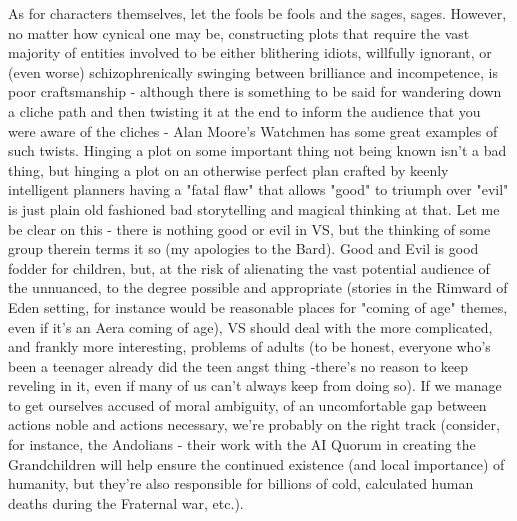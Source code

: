 As for characters themselves, let the fools be fools and the sages,
sages. However, no matter how cynical one may be, constructing plots
that require the vast majority of entities involved to be either
blithering idiots, willfully ignorant, or (even worse)
schizophrenically swinging between brilliance and incompetence, is
poor craftsmanship - although there is something to be said for
wandering down a cliche path and then twisting it at the end to inform
the audience that you were aware of the cliches - Alan Moore's Watchmen
has some great examples of such twists. Hinging a plot on some
important thing not being known isn't a bad thing, but hinging a plot
on an otherwise perfect plan crafted by keenly intelligent planners
having a "fatal flaw" that allows "good" to triumph over "evil" is
just plain old fashioned bad storytelling and magical thinking at
that. Let me be clear on this - there is nothing good or evil in VS,
but the thinking of some group therein terms it so (my apologies to
the Bard).  Good and Evil is good fodder for children, but, at the
risk of alienating the vast potential audience of the unnuanced, to
the degree possible and appropriate (stories in the Rimward of Eden
setting, for instance would be reasonable places for "coming of age"
themes, even if it's an Aera coming of age), VS should deal with the
more complicated, and frankly more interesting, problems of adults (to
be honest, everyone who's been a teenager already did the teen angst
thing -there's no reason to keep reveling in it, even if many of us
can't always keep from doing so). If we manage to get ourselves
accused of moral ambiguity, of an uncomfortable gap between actions
noble and actions necessary, we're probably on the right track
(consider, for instance, the Andolians - their work with the AI Quorum
in creating the Grandchildren will help ensure the continued existence
(and local importance) of humanity, but they're also responsible for
billions of cold, calculated human deaths during the Fraternal war,
etc.).

